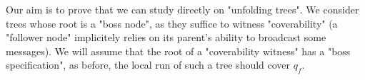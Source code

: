 Our aim is to prove that we can study \COVER directly on "unfolding trees". We consider trees whose root is a "boss node", as they suffice to witness "coverability"  (a "follower node" implicitely relies on its parent's ability to broadcast some messages). We will assume that the root of a "coverability witness" has a "boss specification", as before, the local run of such a tree should cover $q_f$.

\begin{example}
\end{example}
%			
%
%	
%	
%	
